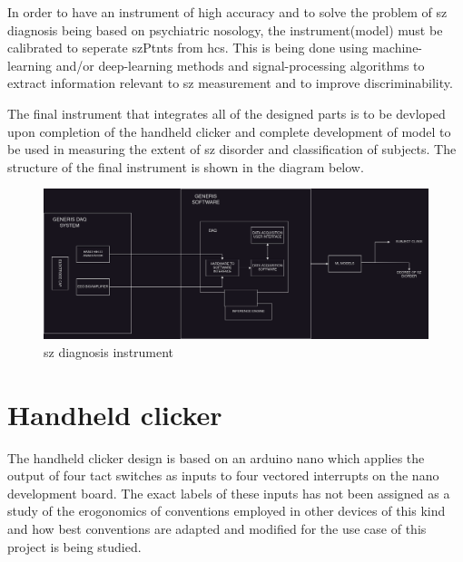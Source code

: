 \documentclass[10pt]{article}
\begin{document}
In order to have an instrument of high accuracy and to solve the problem of \gls{sz} diagnosis 
being based on psychiatric nosology, the instrument(model) must be calibrated to seperate 
\glspl{szPtnt} from \glspl{hc}. This is being done using machine-learning and/or 
deep-learning methods and signal-processing algorithms to extract information relevant to 
\gls{sz} measurement and to improve discriminability.

The final instrument that integrates all of the designed parts is to be devloped upon 
completion of the handheld clicker and complete development of model to be used in 
measuring the extent of \gls{sz} disorder and classification of subjects. The structure 
of the final instrument is shown in the diagram below.
\begin{figure}[H]
  \includegraphics[width=16cm]{../../../images/technical/instrument.drawio.png}
  \caption{\gls{sz} diagnosis instrument}\label{instrument}
\end{figure}


\section{Handheld clicker}
The handheld clicker design is based on an arduino nano which applies the output of four 
tact switches as inputs to four vectored interrupts on the nano development board. The 
exact labels of these inputs has not been assigned as a study of the erogonomics of 
conventions employed in other devices of this kind and how best conventions are adapted and 
modified for the use case of this project is being studied. 
\end{document}
